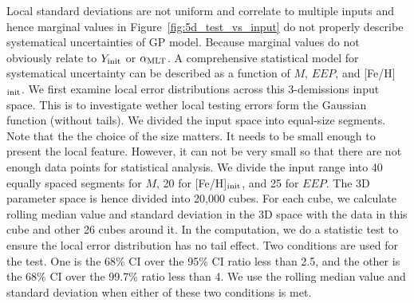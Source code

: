 Local standard deviations are not uniform and correlate to multiple inputs and hence marginal values in Figure~\ref{fig:5d_test_vs_input} do not properly describe systematical uncertainties of GP model.  
% 
Because marginal values do not obviously relate to $Y_{\rm init}$ or $\alpha_{\rm MLT}$. A comprehensive statistical model for systematical uncertainty can be described as a function of $M$, $EEP$, and [Fe/H]$_{\rm init}$. 
%
We first examine local error distributions across this 3-demissions input space. This is to investigate wether local testing errors form the Gaussian function (without tails). We divided the input space into equal-size segments. Note that the the choice of the size matters. It needs to be small enough to present the local feature. However, it can not be very small so that there are not enough data points for statistical analysis. 
%
We divide the input range into 40 equally spaced segments for $M$, 20 for [Fe/H]$_{\rm init}$, and 25 for $EEP$. The 3D parameter space is hence divided into 20,000 cubes. For each cube, we calculate rolling median value and standard deviation in the 3D space with the data in this cube and other 26 cubes around it. 
%
In the computation, we do a statistic test to ensure the local error distribution has no tail effect. Two conditions are used for the test. One is the 68\% CI over the 95\% CI ratio less than 2.5, and the other is the 68\% CI over the 99.7\% ratio less than 4. We use the rolling median value and standard deviation when either of these two conditions is met. 
%







